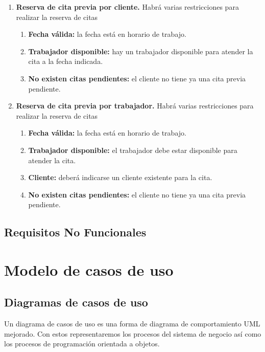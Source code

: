 \begin{enumerate}[leftmargin=1.75cm,start=1,label={\bfseries RS-\arabic*.}]
    \item \textbf{Reserva de cita previa por cliente.} Habrá varias restricciones para realizar la reserva de citas
    \begin{enumerate}[start=1,label={\bfseries RS-4.\arabic*.}]
        \item \textbf{Fecha válida:} la fecha está en horario de trabajo.
        \item \textbf{Trabajador disponible:} hay un trabajador disponible para atender la cita a la fecha indicada.
        \item \textbf{No existen citas pendientes:} el cliente no tiene ya una cita previa pendiente.
    \end{enumerate}

    \item \textbf{Reserva de cita previa por trabajador.} Habrá varias restricciones para realizar la reserva de citas
    \begin{enumerate}[start=1,label={\bfseries RS-5.\arabic*.}]
        \item \textbf{Fecha válida:} la fecha está en horario de trabajo.
        \item \textbf{Trabajador disponible:} el trabajador debe estar disponible para atender la cita.
        \item \textbf{Cliente:} deberá indicarse un cliente existente para la cita.
        \item \textbf{No existen citas pendientes:} el cliente no tiene ya una cita previa pendiente.
    \end{enumerate}
\end{enumerate}

\subsection{Requisitos No Funcionales}

\section{Modelo de casos de uso}

\subsection{Diagramas de casos de uso}

Un diagrama de casos de uso es una forma de diagrama de comportamiento UML mejorado. Con estos representaremos
los procesos del sistema de negocio así como los procesos de programación orientada a objetos.\\

